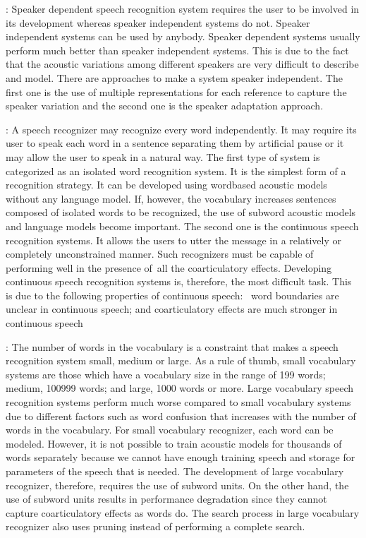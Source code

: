 \documentclass[letterpaper,10pt,english]{jupyterBook}
\begin{document}
\sphinxAtStartPar
{}: Speaker dependent speech recognition system
requires the user to be involved in its development whereas speaker
independent systems do not. Speaker independent systems can be used by
anybody. Speaker dependent systems usually perform much better than
speaker independent systems. This is due to the fact that the acoustic
variations among different speakers are very difficult to describe and
model. There are approaches to make a system speaker independent. The
first one is the use of multiple representations for each reference to
capture the speaker variation and the second one is the speaker
adaptation approach.

\sphinxAtStartPar
{}: A speech recognizer may recognize every word
independently. It may require its user to speak each word in a sentence
separating them by artificial pause or it may allow the user to speak in
a natural way. The first type of system is categorized as an isolated
word recognition system. It is the simplest form of a recognition
strategy. It can be developed using word\sphinxhyphen{}based acoustic models without
any language model. If, however, the vocabulary increases sentences
composed of isolated words to be recognized, the use of sub\sphinxhyphen{}word
acoustic models and language models become important. The second one is
the continuous speech recognition systems. It allows the users to utter
the message in a relatively or completely unconstrained manner. Such
recognizers must be capable of performing well in the presence of all
the co\sphinxhyphen{}articulatory effects. Developing continuous speech recognition
systems is, therefore, the most difficult task. This is due to the
following properties of continuous speech:  word boundaries are unclear
in continuous speech; and co\sphinxhyphen{}articulatory effects are much stronger in
continuous speech

\sphinxAtStartPar
{}: The number of words in the vocabulary is a
constraint that makes a speech recognition system small, medium or
large. As a rule of thumb, small vocabulary systems are those which have
a vocabulary size in the range of 1\sphinxhyphen{}99 words; medium, 100\sphinxhyphen{}999 words; and
large, 1000 words or more. Large vocabulary speech recognition systems
perform much worse compared to small vocabulary systems due to different
factors such as word confusion that increases with the number of words
in the vocabulary. For small vocabulary recognizer, each word can be
modeled. However, it is not possible to train acoustic models for
thousands of words separately because we cannot have enough training
speech and storage for parameters of the speech that is needed. The
development of large vocabulary recognizer, therefore, requires the use
of sub\sphinxhyphen{}word units. On the other hand, the use of sub\sphinxhyphen{}word units results
in performance degradation since they cannot capture co\sphinxhyphen{}articulatory
effects as words do. The search process in large vocabulary recognizer
also uses pruning instead of performing a complete search.
\end{document}
